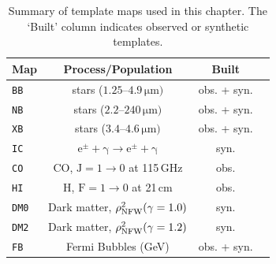 \documentclass[doublespace,nopageskip]{VTthesis} %
\begin{document}

\begin{table}[htb]
	\centering
	\caption{Summary of template maps used in this chapter. The `Built' column indicates observed or synthetic templates.}
	\begin{tabular}{lccc}
        \toprule
		Map & Process/Population                                  & Built               \\
		\midrule
		\texttt{BB}  & stars ($1.25$--$4.9\,\mathrm{\mu m})$     & obs. + syn.        \\
		\texttt{NB}  & stars  ($2.2$--$240\,\mathrm{\mu m})$     & obs. + syn. \\
		\texttt{XB}  & stars ($3.4$--$4.6\,\mathrm{\mu m})$     & obs. + syn. \\ 
		\texttt{IC}  & $\mathrm{e^{\pm}+\gamma \rightarrow e^{\pm}+\gamma}$ & syn.        \\
		\texttt{CO}  & CO, $\mathrm{J=1 \rightarrow 0}$ at 115\,GHz            & obs.        \\
		\texttt{HI}  & H, $\mathrm{F=1 \rightarrow 0}$ at 21\,cm               & obs.        \\
		\texttt{DM0} & Dark matter, $\rho_{\rm NFW}^2(\gamma=1.0)$             & syn.        \\
		\texttt{DM2} & Dark matter, $\rho_{\rm NFW}^2(\gamma=1.2)$             & syn.        \\
		\texttt{FB}  & Fermi Bubbles (GeV)                                 & obs. + syn. \\
		\bottomrule
	\end{tabular}
	\label{tab:maps}
\end{table}
\end{document}
